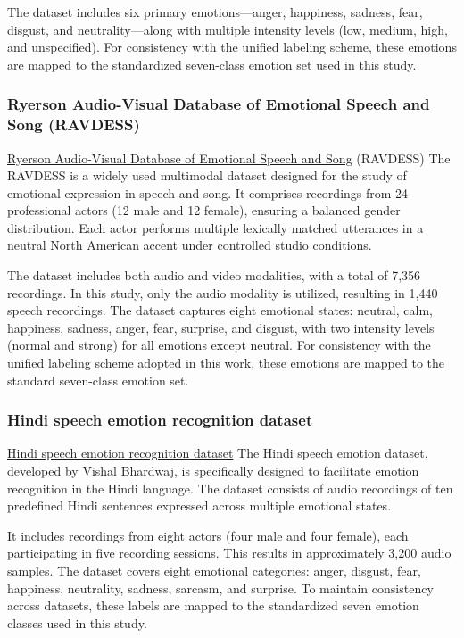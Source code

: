 \documentclass[iicol,sn-mathphys-num]{sn-jnl}%
\theoremstyle{thmstyleone}%
\theoremstyle{thmstyletwo}%
\theoremstyle{thmstylethree}%
\begin{document}
The dataset includes six primary emotions—anger, happiness, sadness, fear, disgust, and neutrality—along with multiple intensity levels (low, medium, high, and unspecified). For consistency with the unified labeling scheme, these emotions are mapped to the standardized seven-class emotion set used in this study.

\subsubsection{Ryerson Audio-Visual Database of Emotional Speech and Song (RAVDESS)}\label{subsubsec3.1.2}
\href{https://www.kaggle.com/datasets/uwrfkaggler/ravdess-emotional-speech-audio}{Ryerson Audio-Visual Database of Emotional Speech and Song} (RAVDESS) The RAVDESS is a widely used multimodal dataset designed for the study of emotional expression in speech and song. It comprises recordings from 24 professional actors (12 male and 12 female), ensuring a balanced gender distribution. Each actor performs multiple lexically matched utterances in a neutral North American accent under controlled studio conditions.

The dataset includes both audio and video modalities, with a total of 7,356 recordings. In this study, only the audio modality is utilized, resulting in 1,440 speech recordings. The dataset captures eight emotional states: neutral, calm, happiness, sadness, anger, fear, surprise, and disgust, with two intensity levels (normal and strong) for all emotions except neutral. For consistency with the unified labeling scheme adopted in this work, these emotions are mapped to the standard seven-class emotion set.

\subsubsection{Hindi speech emotion recognition dataset}\label{subsubsec3.1.3}
\href{https://www.kaggle.com/datasets/vishlb/speech-emotion-recognition-hindi}{Hindi speech emotion recognition dataset}
The Hindi speech emotion dataset, developed by Vishal Bhardwaj, is specifically designed to facilitate emotion recognition in the Hindi language. The dataset consists of audio recordings of ten predefined Hindi sentences expressed across multiple emotional states.

It includes recordings from eight actors (four male and four female), each participating in five recording sessions. This results in approximately 3,200 audio samples. The dataset covers eight emotional categories: anger, disgust, fear, happiness, neutrality, sadness, sarcasm, and surprise. To maintain consistency across datasets, these labels are mapped to the standardized seven emotion classes used in this study.
\end{document}
